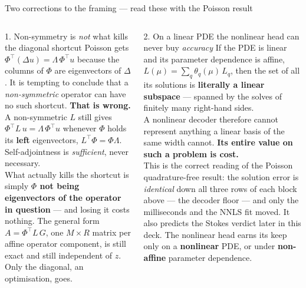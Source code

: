 \documentclass[10pt,aspectratio=169]{beamer}
\newcommand{\T}{^{\top}}
\begin{document}
\begin{frame}{Two corrections to the framing --- read these with the Poisson result}
  \footnotesize
  \begin{columns}[T]
    \begin{alertblock}{1. Non-symmetry is \emph{not} what kills the diagonal shortcut}
      Poisson gets $\Phi\T(\Delta u)=\Lambda\,\Phi\T u$ because the columns of $\Phi$ are
      eigenvectors of $\Delta$. It is tempting to conclude that a \emph{non-symmetric} operator can
      have no such shortcut. \textbf{That is wrong.}\\[3pt]
      A non-symmetric $L$ still gives $\Phi\T L\,u=\Lambda\,\Phi\T u$ whenever $\Phi$ holds its
      \textbf{left} eigenvectors, $L\T\Phi=\Phi\Lambda$. Self-adjointness is \emph{sufficient}, never
      necessary.\\[3pt]
      What actually kills the shortcut is simply \textbf{$\Phi$ not being eigenvectors of the operator
      in question} --- and losing it costs nothing. The general form $A=\Phi\T L\,G$, one $M\times R$
      matrix per affine operator component, is still exact and still independent of $z$. Only the
      diagonal, an optimisation, goes.
    \end{alertblock}
    \begin{alertblock}{2. On a linear PDE the nonlinear head can never buy \emph{accuracy}}
      If the PDE is linear and its parameter dependence is affine,
      $L(\mu)=\sum_q\theta_q(\mu)\,L_q$, then the set of all its solutions is \textbf{literally a
      linear subspace} --- spanned by the solves of finitely many right-hand sides.\\[3pt]
      A nonlinear decoder therefore cannot represent anything a linear basis of the same width
      cannot. \textbf{Its entire value on such a problem is cost.}\\[3pt]
      This is the correct reading of the Poisson quadrature-free result: the solution error is
      \emph{identical} down all three rows of each block above --- the decoder floor --- and only the
      milliseconds and the NNLS fit moved. It also predicts the Stokes verdict later in this deck.
      The nonlinear head earns its keep only on a \textbf{nonlinear} PDE, or under \textbf{non-affine}
      parameter dependence.
    \end{alertblock}
  \end{columns}
\end{frame}
\end{document}
